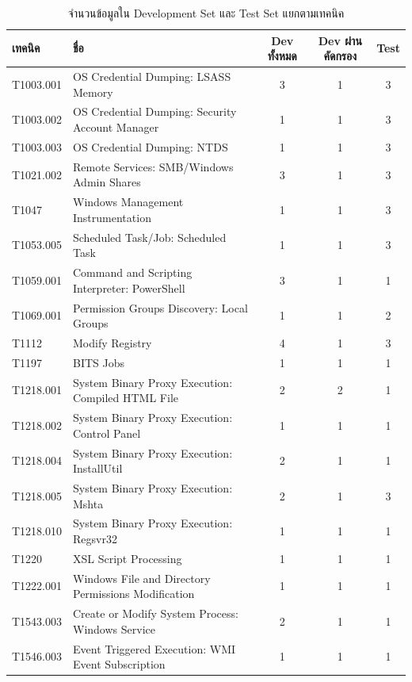 \begin{table}[htbp]
  \centering
  \caption{จำนวนข้อมูลใน Development Set และ Test Set แยกตามเทคนิค}
  \label{tab:dev-test}
  \footnotesize
  \begin{tabular}{|l|L{0.43\textwidth}|c|c|c|}
    \hline
    \textbf{เทคนิค} & \textbf{ชื่อ} & \textbf{Dev ทั้งหมด} & \textbf{Dev ผ่านคัดกรอง} & \textbf{Test} \\ \hline
    T1003.001 & OS Credential Dumping: LSASS Memory & 3 & 1 & 3 \\ \hline
    T1003.002 & OS Credential Dumping: Security Account Manager & 1 & 1 & 3 \\ \hline
    T1003.003 & OS Credential Dumping: NTDS & 1 & 1 & 3 \\ \hline
    T1021.002 & Remote Services: SMB/Windows Admin Shares & 3 & 1 & 3 \\ \hline
    T1047 & Windows Management Instrumentation & 1 & 1 & 3 \\ \hline
    T1053.005 & Scheduled Task/Job: Scheduled Task & 1 & 1 & 3 \\ \hline
    T1059.001 & Command and Scripting Interpreter: PowerShell & 3 & 1 & 1 \\ \hline
    T1069.001 & Permission Groups Discovery: Local Groups & 1 & 1 & 2 \\ \hline
    T1112 & Modify Registry & 4 & 1 & 3 \\ \hline
    T1197 & BITS Jobs & 1 & 1 & 1 \\ \hline
    T1218.001 & System Binary Proxy Execution: Compiled HTML File & 2 & 2 & 1 \\ \hline
    T1218.002 & System Binary Proxy Execution: Control Panel & 1 & 1 & 1 \\ \hline
    T1218.004 & System Binary Proxy Execution: InstallUtil & 2 & 1 & 1 \\ \hline
    T1218.005 & System Binary Proxy Execution: Mshta & 2 & 1 & 3 \\ \hline
    T1218.010 & System Binary Proxy Execution: Regsvr32 & 1 & 1 & 1 \\ \hline
    T1220 & XSL Script Processing & 1 & 1 & 1 \\ \hline
    T1222.001 & Windows File and Directory Permissions Modification & 1 & 1 & 1 \\ \hline
    T1543.003 & Create or Modify System Process: Windows Service & 2 & 1 & 1 \\ \hline
    T1546.003 & Event Triggered Execution: WMI Event Subscription & 1 & 1 & 1 \\ \hline

\end{tabular}
\end{table}

